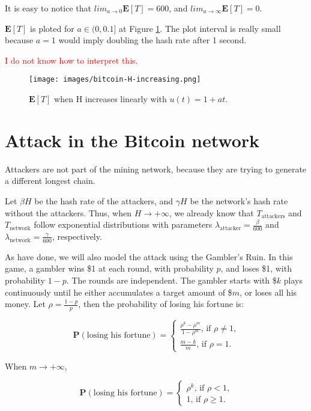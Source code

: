 It is easy to notice that $lim_{a \rightarrow 0} \mathbf{E}[T] = 600$, and $lim_{a \rightarrow \infty} \mathbf{E}[T] = 0$.

$\mathbf{E}[T]$ is ploted for $a \in (0, 0.1]$ at Figure \ref{fig-bitcoin-H-increase}. The plot interval is really small because $a=1$ would imply doubling the hash rate after 1 second.

\textcolor{red}{I do not know how to interpret this.}

\begin{figure}[ht]
\centering\texttt{[image: images/bitcoin-H-increasing.png]}
\caption{$\mathbf{E}[T]$ when H increases linearly with $u(t) = 1 + at$.\label{fig-bitcoin-H-increase}}
\end{figure}


\section{Attack in the Bitcoin network}

Attackers are not part of the mining network, because they are trying to generate a different longest chain.

Let $\beta H$ be the hash rate of the attackers, and $\gamma H$ be the network's hash rate without the attackers. Thus, when $H \rightarrow +\infty$, we already know that $T_{\text{attackers}}$ and $T_{\text{network}}$ follow exponential distributions with parameters $\lambda_{\text{attacker}} = \frac{\beta}{600}$ and $\lambda_{\text{network}} = \frac{\gamma}{600}$, respectively.

As \cite{nakamoto2008bitcoin} have done, we will also model the attack using the Gambler's Ruin. In this game, a gambler wins \$1 at each round, with probability $p$, and loses \$1, with probability $1-p$. The rounds are independent. The gambler starts with \$$k$ plays continuously until he either accumulates a target amount of \$$m$, or loses all his money. Let $\rho = \frac{1-p}{p}$, then the probability of losing his fortune is:

$$
\mathbf{P}(\text{losing his fortune}) =
\begin{cases}
	\frac{\rho^k - \rho^m}{1-\rho^m} \text{, if $\rho \ne 1$,} \\
	\frac{m-k}{m} \text{, if $\rho = 1$.}
\end{cases}
$$

When $m \rightarrow +\infty$,

$$
\mathbf{P}(\text{losing his fortune}) =
\begin{cases}
	\rho^k \text{, if $\rho < 1$,} \\
	1 \text{, if $\rho \geq 1$.}
\end{cases}
$$

